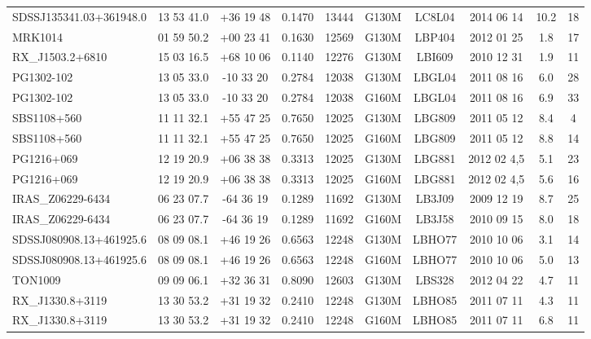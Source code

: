 \documentclass[iop]{emulateapj-rtx4}
\begin{document}
\begin{table}[ht]
\begin{center}
\begin{tabular}{l c c c c c c c c c}
 SDSSJ135341.03+361948.0 	& 13 53 41.0  &  +36 19 48  &  0.1470  & 13444 & G130M     & LC8L04   & 2014 06 14  &   10.2 &  18  \\
 MRK1014 				& 01 59 50.2  &  +00 23 41  &  0.1630  & 12569 & G130M     & LBP404   & 2012 01 25  &    1.8 &  17  \\
 RX\_J1503.2+6810 	 		& 15 03 16.5  &  +68 10 06  &  0.1140  & 12276 & G130M     & LBI609    & 2010 12 31 &      1.9 &  11  \\
 PG1302-102 				& 13 05 33.0  &  -10 33 20   &  0.2784  & 12038 & G130M     & LBGL04  & 2011 08 16  &     6.0 &  28  \\
 PG1302-102 				& 13 05 33.0  &  -10 33 20   &  0.2784  & 12038 & G160M     & LBGL04  & 2011 08 16  &     6.9 &  33  \\
 SBS1108+560 			         & 11 11 32.1  &  +55 47 25  &  0.7650  & 12025 & G130M     & LBG809  & 2011 05 12   &     8.4 & 4  \\
 SBS1108+560 			         & 11 11 32.1  &  +55 47 25  &  0.7650  & 12025 & G160M     & LBG809  & 2011 05 12   &     8.8 & 14  \\
 PG1216+069				& 12 19 20.9  &  +06 38 38  &  0.3313  & 12025 & G130M     & LBG881  & 2012 02 4,5  &    5.1 &  23  \\
 PG1216+069				& 12 19 20.9  &  +06 38 38  &  0.3313  & 12025 & G160M     & LBG881  & 2012 02 4,5  &    5.6 &  16  \\
 IRAS\_Z06229-6434 		& 06 23 07.7  &  -64 36 19   &  0.1289 & 11692	 & G130M     & LB3J09   & 2009 12 19   &     8.7 &  25  \\
 IRAS\_Z06229-6434 		& 06 23 07.7  &  -64 36 19   &  0.1289 & 11692	 & G160M     & LB3J58   & 2010 09 15   &     8.0 &  18  \\
 SDSSJ080908.13+461925.6 	& 08 09 08.1  &  +46 19 26  &  0.6563 & 12248	 & G130M     & LBHO77  & 2010 10 06   &    3.1 &  14  \\
 SDSSJ080908.13+461925.6 	& 08 09 08.1  &  +46 19 26  &  0.6563 & 12248	 & G160M     & LBHO77  & 2010 10 06   &    5.0 &  13  \\
 TON1009 				& 09 09 06.1  &  +32 36 31  &  0.8090 & 12603  & G130M     & LBS328   & 2012 04 22   &    4.7 &  11  \\
 RX\_J1330.8+3119 			& 13 30 53.2  &  +31 19 32  &  0.2410 & 12248	 & G130M     & LBHO85  & 2011 07 11    &    4.3 &  11  \\
 RX\_J1330.8+3119 			& 13 30 53.2  &  +31 19 32  &  0.2410 & 12248	 & G160M     & LBHO85  & 2011 07 11    &    6.8 &  11  \\

\end{tabular}
\end{center}
\end{table}
\end{document}
